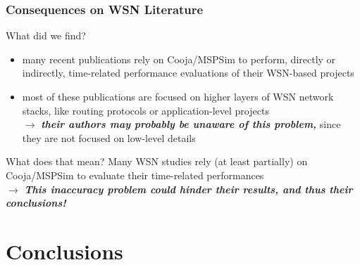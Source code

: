 \documentclass[10pt,c]{beamer}
\renewcommand{\emph}[1]{\textbf{\textit{#1}}}
\begin{document}
\begin{frame}
\vspace{-0.25cm}
\frametitle{Consequences on WSN Literature}
\begin{block}{What did we find?}
\begin{itemize}
\item many recent publications rely on Cooja/MSPSim to perform, directly
or indirectly, time-related performance evaluations of their WSN-based
projects
\cite{Constrain-Routing-Trees-2014} \cite{Co-RPL-2014} \cite{DINAS-2014}
\cite{Efficient-Distrib-Svc-Discovery-2014} \cite{IETF-Routing-WSN-2014}
\cite{TinySDN-2014} \cite{Trickle-L2-2014}
\cite{Visual-Sensor-Networks-2014} \cite{Key-Mgmt-2015}
\item most of these publications are focused on higher layers of WSN
network stacks, like routing protocols 
\cite{Constrain-Routing-Trees-2014} \cite{Co-RPL-2014}
\cite{IETF-Routing-WSN-2014} \cite{Trickle-L2-2014}
or application-level projects
\cite{DINAS-2014} \cite{Efficient-Distrib-Svc-Discovery-2014}
\cite{Visual-Sensor-Networks-2014} \cite{Key-Mgmt-2015} \\
$\rightarrow$ \emph{their authors may probably be unaware of this problem,}
since they are not focused on low-level details
\end{itemize}
\end{block}
\vspace{-0.25cm}
\begin{alertblock}{What does that mean?}
Many WSN studies rely (at least partially) on Cooja/MSPSim to evaluate
their time-related performances \\
$\rightarrow$ \emph{This inaccuracy problem could hinder their results,
and thus their conclusions!}
\end{alertblock}
\end{frame}


\section{Conclusions}
\end{document}

